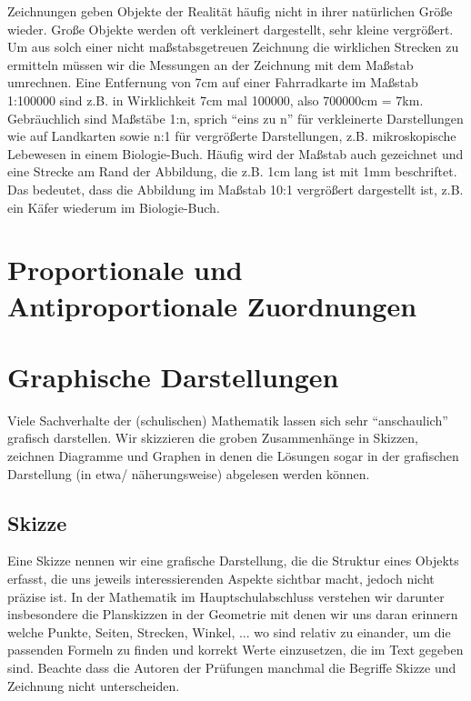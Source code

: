 \documentclass[a4paper]{book}%
\theoremstyle{definition}
\begin{document}
Zeichnungen geben Objekte der Realität häufig nicht in ihrer natürlichen Größe wieder. Große Objekte werden oft verkleinert dargestellt, sehr kleine vergrößert. Um aus solch einer nicht maßstabsgetreuen Zeichnung die wirklichen Strecken zu ermitteln müssen wir die Messungen an der Zeichnung mit dem Maßstab umrechnen. Eine Entfernung von 7cm auf einer Fahrradkarte im Maßstab 1:100000 sind z.B. in Wirklichkeit 7cm mal 100000, also 700000cm = 7km. Gebräuchlich sind Maßstäbe 1:n, sprich \enquote{eins zu n} für verkleinerte Darstellungen wie auf Landkarten sowie n:1 für vergrößerte Darstellungen, z.B. mikroskopische Lebewesen in einem Biologie-Buch. Häufig wird der Maßstab auch gezeichnet und eine Strecke am Rand der Abbildung, die z.B. 1cm lang ist mit 1mm beschriftet. Das bedeutet, dass die Abbildung im Maßstab 10:1 vergrößert dargestellt ist, z.B. ein Käfer wiederum im Biologie-Buch.


\chapter{Proportionale und Antiproportionale Zuordnungen}


\chapter{Graphische Darstellungen}

Viele Sachverhalte der (schulischen) Mathematik lassen sich sehr \enquote{anschaulich} grafisch darstellen. Wir skizzieren die groben Zusammenhänge in Skizzen, zeichnen Diagramme und Graphen in denen die Lösungen sogar in der grafischen Darstellung (in etwa/ näherungsweise) abgelesen werden können.


\section{Skizze}

Eine Skizze nennen wir eine grafische Darstellung, die die Struktur eines Objekts erfasst, die uns jeweils interessierenden Aspekte sichtbar macht, jedoch nicht präzise ist. In der Mathematik im Hauptschulabschluss verstehen wir darunter insbesondere die Planskizzen in der Geometrie mit denen wir uns daran erinnern welche Punkte, Seiten, Strecken, Winkel, ... wo sind relativ zu einander, um die passenden Formeln zu finden und korrekt Werte einzusetzen, die im Text gegeben sind. Beachte dass die Autoren der Prüfungen manchmal die Begriffe Skizze und Zeichnung nicht unterscheiden.
\end{document}
